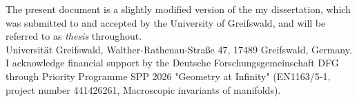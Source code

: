 \documentclass[a4paper,11pt]{article}
\theoremstyle{definition}
\theoremstyle{plain}
\theoremstyle{remark}
\begin{document}
\newpage




\thispagestyle{empty}

\null 

\vfill

The present document is a slightly modified version of the my dissertation, which was submitted to and accepted by the University of Greifswald, and will be referred to as \textit{thesis} throughout. \\

Universität Greifswald, Walther-Rathenau-Straße 47, 17489 Greifswald, Germany. I acknowledge financial support by the Deutsche Forschungsgemeinschaft DFG through Priority Programme SPP 2026 "Geometry at Infinity" (EN1163/5-1, project number 441426261, Macroscopic invariants of manifolds).\\



\vspace{1cm}

\newpage

\tableofcontents

\newpage
\end{document}
